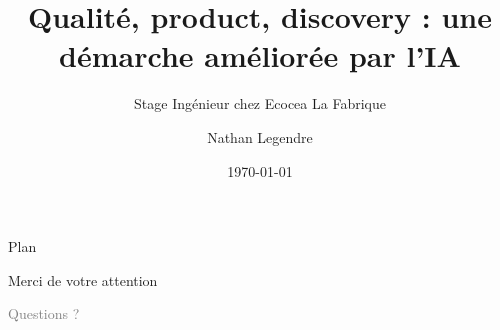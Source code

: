 \documentclass[aspectratio=169,xcolor=dvipsnames]{beamer}
\title[Qualité, produit, discovery]{Qualité, product, discovery : une démarche améliorée par l'IA}
\subtitle{Stage Ingénieur chez Ecocea La Fabrique}
\author[Nathan Legendre]{Nathan Legendre}
\institute[INSA Rouen]{%
  Département ISIA \\
  INSA Rouen Normandie
  \vskip 3pt}
\date{\today}
\begin{document}
\begin{frame}
  \titlepage
\end{frame}

\begin{frame}{Plan}
  \tableofcontents
\end{frame}








\begin{frame}
  \Huge{\centerline{Merci de votre attention}}
  \vskip 12pt
  \normalsize{\centerline{\textcolor{gray}{Questions ?}}}
\end{frame}
\end{document}
